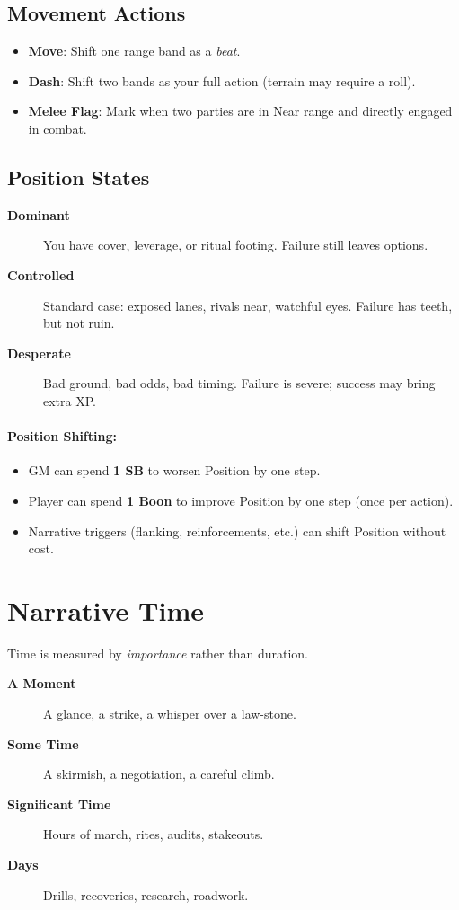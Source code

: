 \subsection*{Movement Actions}
\label{sec:movement-actions}
\begin{itemize}
\item \textbf{Move}: Shift one range band as a \emph{beat}.
\item \textbf{Dash}: Shift two bands as your full action (terrain may require a roll).
\item \textbf{Melee Flag}: Mark when two parties are in Near range and directly engaged in combat.
\end{itemize}

\subsection*{Position States}
\begin{description}
\item[\textbf{Dominant}]  You have cover, leverage, or ritual footing. Failure still leaves options.
\item[\textbf{Controlled}]  Standard case: exposed lanes, rivals near, watchful eyes. Failure has teeth, but not ruin.
\item[\textbf{Desperate}]  Bad ground, bad odds, bad timing. Failure is severe; success may bring extra XP.
\end{description}

\paragraph{Position Shifting:}
\begin{itemize}
\item GM can spend \textbf{1 SB} to worsen Position by one step.
\item Player can spend \textbf{1 Boon} to improve Position by one step (once per action).
\item Narrative triggers (flanking, reinforcements, etc.) can shift Position without cost.
\end{itemize}

\section{Narrative Time}
\label{sec:narrative-time}
Time is measured by \emph{importance} rather than duration.
\begin{description}
\item[\textbf{A Moment}]  A glance, a strike, a whisper over a law-stone.
\item[\textbf{Some Time}]  A skirmish, a negotiation, a careful climb.
\item[\textbf{Significant Time}]  Hours of march, rites, audits, stakeouts.
\item[\textbf{Days}]  Drills, recoveries, research, roadwork.
\end{description}

